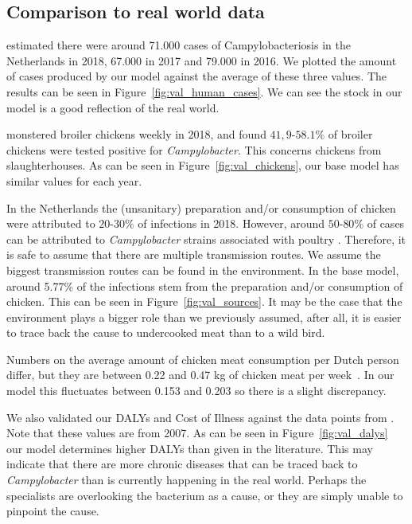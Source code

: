 \subsection{Comparison to real world data}

\textcite{vlaanderen_staat_2019} estimated there were around 71.000 cases of Campylobacteriosis in the Netherlands in 2018, 67.000 in 2017 and 79.000 in 2016. We plotted the amount of cases produced by our model against the average of these three values. The results can be seen in Figure~\ref{fig:val_human_cases}. We can see the stock in our model is a good reflection of the real world. 

\textcite{nepluvi_rapportage_2019} monstered broiler chickens weekly in 2018, and found $41,9$-$58.1\%$ of broiler chickens were tested positive for \textit{Campylobacter}. This concerns chickens from slaughterhouses. As can be seen in Figure~\ref{fig:val_chickens}, our base model has similar values for each year.

In the Netherlands the (unsanitary) preparation and/or consumption of chicken were attributed to $20$-$30\%$ of infections in 2018. However, around $50$-$80\%$ of cases can be attributed to \textit{Campylobacter} strains associated with poultry \parencite{cuperus_surveillance_2020, nepluvi_rapportage_2019}. Therefore, it is safe to assume that there are multiple transmission routes. We assume the biggest transmission routes can be found in the environment. In the base model, around 5.77\% of the infections stem from the preparation and/or consumption of chicken. This can be seen in Figure~\ref{fig:val_sources}. It may be the case that the environment plays a bigger role than we previously assumed, after all, it is easier to trace back the cause to undercooked meat than to a wild bird.

Numbers on the average amount of chicken meat consumption per Dutch person differ, but they are between 0.22 and 0.47 kg of chicken meat per week~\parencite{schotman_europese_2018, waveningen_university__research_we_2020}. In our model this fluctuates between 0.153 and 0.203 so there is a slight discrepancy.

We also validated our DALYs and Cost of Illness against the data points from \parencite{mangen_campylobacteriosis_2007}. Note that these values are from 2007. As can be seen in Figure~\ref{fig:val_dalys} our model determines higher DALYs than given in the literature. This may indicate that there are more chronic diseases that can be traced back to \textit{Campylobacter} than is currently happening in the real world. Perhaps the specialists are overlooking the bacterium as a cause, or they are simply unable to pinpoint the cause.


